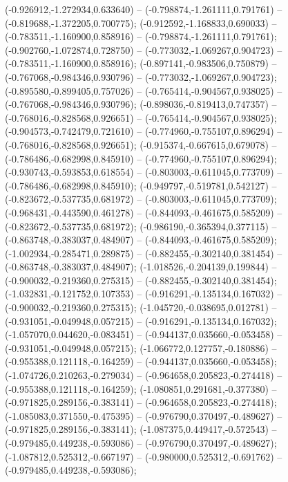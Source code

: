  (-0.926912,-1.272934,0.633640) -- (-0.798874,-1.261111,0.791761) -- (-0.819688,-1.372205,0.700775);
 (-0.912592,-1.168833,0.690033) -- (-0.783511,-1.160900,0.858916) -- (-0.798874,-1.261111,0.791761);
 (-0.902760,-1.072874,0.728750) -- (-0.773032,-1.069267,0.904723) -- (-0.783511,-1.160900,0.858916);
 (-0.897141,-0.983506,0.750879) -- (-0.767068,-0.984346,0.930796) -- (-0.773032,-1.069267,0.904723);
 (-0.895580,-0.899405,0.757026) -- (-0.765414,-0.904567,0.938025) -- (-0.767068,-0.984346,0.930796);
 (-0.898036,-0.819413,0.747357) -- (-0.768016,-0.828568,0.926651) -- (-0.765414,-0.904567,0.938025);
 (-0.904573,-0.742479,0.721610) -- (-0.774960,-0.755107,0.896294) -- (-0.768016,-0.828568,0.926651);
 (-0.915374,-0.667615,0.679078) -- (-0.786486,-0.682998,0.845910) -- (-0.774960,-0.755107,0.896294);
 (-0.930743,-0.593853,0.618554) -- (-0.803003,-0.611045,0.773709) -- (-0.786486,-0.682998,0.845910);
 (-0.949797,-0.519781,0.542127) -- (-0.823672,-0.537735,0.681972) -- (-0.803003,-0.611045,0.773709);
 (-0.968431,-0.443590,0.461278) -- (-0.844093,-0.461675,0.585209) -- (-0.823672,-0.537735,0.681972);
 (-0.986190,-0.365394,0.377115) -- (-0.863748,-0.383037,0.484907) -- (-0.844093,-0.461675,0.585209);
 (-1.002934,-0.285471,0.289875) -- (-0.882455,-0.302140,0.381454) -- (-0.863748,-0.383037,0.484907);
 (-1.018526,-0.204139,0.199844) -- (-0.900032,-0.219360,0.275315) -- (-0.882455,-0.302140,0.381454);
 (-1.032831,-0.121752,0.107353) -- (-0.916291,-0.135134,0.167032) -- (-0.900032,-0.219360,0.275315);
 (-1.045720,-0.038695,0.012781) -- (-0.931051,-0.049948,0.057215) -- (-0.916291,-0.135134,0.167032);
 (-1.057070,0.044620,-0.083451) -- (-0.944137,0.035660,-0.053458) -- (-0.931051,-0.049948,0.057215);
 (-1.066772,0.127757,-0.180886) -- (-0.955388,0.121118,-0.164259) -- (-0.944137,0.035660,-0.053458);
 (-1.074726,0.210263,-0.279034) -- (-0.964658,0.205823,-0.274418) -- (-0.955388,0.121118,-0.164259);
 (-1.080851,0.291681,-0.377380) -- (-0.971825,0.289156,-0.383141) -- (-0.964658,0.205823,-0.274418);
 (-1.085083,0.371550,-0.475395) -- (-0.976790,0.370497,-0.489627) -- (-0.971825,0.289156,-0.383141);
 (-1.087375,0.449417,-0.572543) -- (-0.979485,0.449238,-0.593086) -- (-0.976790,0.370497,-0.489627);
 (-1.087812,0.525312,-0.667197) -- (-0.980000,0.525312,-0.691762) -- (-0.979485,0.449238,-0.593086);
